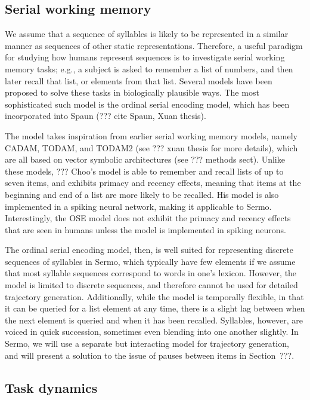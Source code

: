 \subsection{Serial working memory}

We assume that a sequence of syllables
is likely to be represented
in a similar manner
as sequences of other static representations.
Therefore, a useful paradigm for studying
how humans represent sequences
is to investigate serial working memory tasks;
e.g., a subject is asked to remember
a list of numbers,
and then later recall that list,
or elements from that list.
Several models have been proposed
to solve these tasks
in biologically plausible ways.
The most sophisticated such model
is the ordinal serial encoding model,
which has been incorporated into
Spaun (??? cite Spaun, Xuan thesis).

The model takes inspiration from
earlier serial working memory models,
namely CADAM, TODAM, and TODAM2
(see ??? xuan thesis for more details),
which are all based on
vector symbolic architectures
(see ??? methods sect).
Unlike these models,
??? Choo's model
is able to remember and recall
lists of up to seven items,
and exhibits primacy and recency effects,
meaning that items at the beginning
and end of a list are more likely
to be recalled.
His model is also implemented
in a spiking neural network,
making it applicable to Sermo.
Interestingly,
the OSE model does not exhibit
the primacy and recency effects
that are seen in humans
unless the model
is implemented in spiking neurons.

The ordinal serial encoding model,
then, is well suited for representing
discrete sequences of syllables in Sermo,
which typically have few elements
if we assume that most syllable sequences
correspond to words in one's lexicon.
However, the model is limited to
discrete sequences,
and therefore cannot be used
for detailed trajectory generation.
Additionally,
while the model is temporally flexible,
in that it can be queried for
a list element at any time,
there is a slight lag between
when the next element is queried
and when it has been recalled.
Syllables, however, are voiced in quick succession,
sometimes even blending into one another slightly.
In Sermo, we will use a separate but interacting model
for trajectory generation,
and will present a solution
to the issue of pauses between items
in Section~???.

\subsection{Task dynamics}

